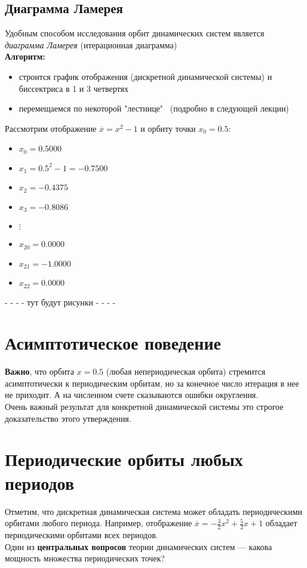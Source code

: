 \subsection{Диаграмма Ламерея}
Удобным способом исследования орбит динамических систем является \textit{диаграмма Ламерея} (итерационная диаграмма)
\\[2mm]
\textbf{Алгоритм{:} }
\begin{itemize}
    \item строится график отображения (дискретной динамической системы) и биссектриса в 1 и 3 четвертях
    \item перемещаемся по некоторой "лестнице" \, (подробно в следующей лекции)
\end{itemize}
Рассмотрим отображение \(\overline{x} = x^2 - 1 \) и орбиту точки \(x_0 = 0.5{:}\)
\begin{itemize}
    \item[] \(x_0 = 0.5000\)
    \item[] \(x_1 = 0.5^2 - 1 = -0.7500\)
    \item[] \(x_2 = -0.4375\)
    \item[] \(x_3 = -0.8086\)
    \item[] \(\vdots\)
    \item[] \(x_{20} = 0.0000 \)
    \item[] \(x_{21} = -1.0000 \)
    \item[] \(x_{22} = 0.0000 \)
\end{itemize}
- - - - тут будут рисунки - - - -

\section{Асимптотическое поведение}
\textbf{Важно}, что орбита \(x = 0.5\) (любая непериодическая орбита) стремится асимптотически к периодическим орбитам, но за конечное число итерация в нее не приходит.
А на численном счете сказываются ошибки округления.
\\[2mm]
Очень важный результат для конкретной динамической системы это строгое доказательство этого утверждения. 

\section{Периодические орбиты любых периодов}
Отметим, что дискретная динамическая система может обладать периодическими орбитами любого периода.
Например, отображение \(\overline{x} = -\frac{3}{2}x^2 + \frac{5}{2}x + 1\) обладает периодическими орбитами всех периодов.
\\[2mm]
Один из \textbf{центральных вопросов} теории динамических систем --- какова мощность множества периодических точек?


